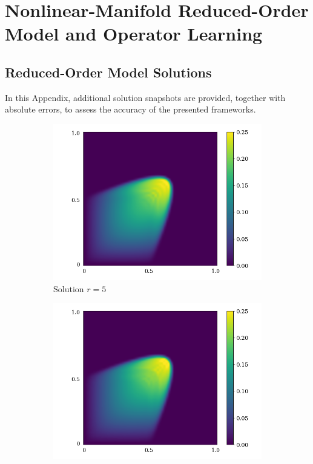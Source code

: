 \chapter{Nonlinear-Manifold Reduced-Order Model and Operator Learning}
\section{Reduced-Order Model Solutions}
In this Appendix, additional solution snapshots are provided, together with absolute errors, to assess the accuracy of the presented frameworks.
\begin{figure}[!htb]
     \begin{center}
        \begin{subfigure}[b]{0.23\textwidth}
            \begin{center}
                \includegraphics[trim = {0, 0, 3cm, 0}, clip, width=\textwidth]{Pictures/X-rom-LE-DAE-5.png}
            \end{center}
            \caption{Solution $r = 5$}
        \end{subfigure}
   \begin{subfigure}[b]{0.23\textwidth}
            \begin{center}
                \includegraphics[trim = {0, 0, 3cm, 0}, clip, width=\textwidth]{Pictures/X-rom-LE-DAE-10.png}

\end{center}
\end{subfigure}
\end{center}
\end{figure}
